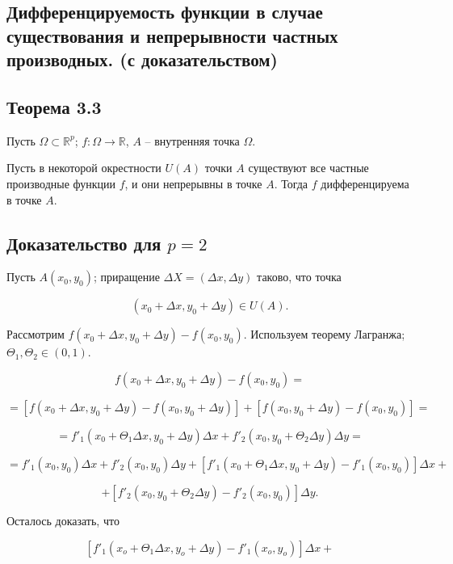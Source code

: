 {
\subsection{Дифференцируемость функции в случае существования и непрерывности частных производных. (с доказательством)}

\subsection*{Теорема 3.3}

Пусть \( \Omega \subset \mathbb{R}^p \); \( f: \Omega \to \mathbb{R} \), \( A \) – внутренняя точка \( \Omega \).

Пусть в некоторой окрестности \( U(A) \) точки \( A \) существуют все частные производные функции \( f \), и они непрерывны в точке \( A \). Тогда \( f \) дифференцируема в точке \( A \).

\subsection*{Доказательство для \( p = 2 \)}

Пусть \( A(x_0, y_0) \); приращение \( \Delta X = (\Delta x, \Delta y) \) таково, что точка



\[
(x_0 + \Delta x, y_0 + \Delta y) \in U(A).
\]



Рассмотрим \( f(x_0 + \Delta x, y_0 + \Delta y) - f(x_0, y_0) \). Используем теорему Лагранжа; \( \Theta_1, \Theta_2 \in (0, 1) \).

\[
f(x_0 + \Delta x, y_0 + \Delta y) - f(x_0, y_0) =
\]

\[
= [f(x_0 + \Delta x, y_0 + \Delta y) - f(x_0, y_0 + \Delta y)] + [f(x_0, y_0 + \Delta y) - f(x_0, y_0)] =
\]


\[
= f'_1(x_0 + \Theta_1 \Delta x, y_0 + \Delta y) \Delta x + f'_2(x_0, y_0 + \Theta_2 \Delta y) \Delta y =
\]


\[
= f'_1(x_0, y_0) \Delta x + f'_2(x_0, y_0) \Delta y + [f'_1(x_0 + \Theta_1 \Delta x, y_0 + \Delta y) - f'_1(x_0, y_0)] \Delta x +
\]

\[
+ [f'_2(x_0, y_0 + \Theta_2 \Delta y) - f'_2(x_0, y_0)] \Delta y.
\]


Осталось доказать, что 



\[
[f'_1(x_o + \Theta_1 \Delta x, y_o + \Delta y) - f'_1(x_o, y_o)] \Delta x +
\]





}
